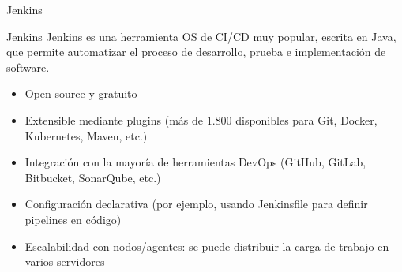 \documentclass{beamer}
\begin{document}
\begin{frame}{Jenkins}

\begin{block}{Jenkins}
Jenkins es una herramienta OS de CI/CD muy popular, escrita en Java, que permite automatizar el proceso de desarrollo, prueba e implementación de software.
\end{block}

\begin{itemize}
    \item Open source y gratuito

    \item Extensible mediante plugins (más de 1.800 disponibles para Git, Docker, Kubernetes, Maven, etc.)

    \item  Integración con la mayoría de herramientas DevOps (GitHub, GitLab, Bitbucket, SonarQube, etc.)
    
    \item Configuración declarativa (por ejemplo, usando Jenkinsfile para definir pipelines en código)
    
    \item Escalabilidad con nodos/agentes: se puede distribuir la carga de trabajo en varios servidores
\end{itemize}
    
\end{frame}
\end{document}
